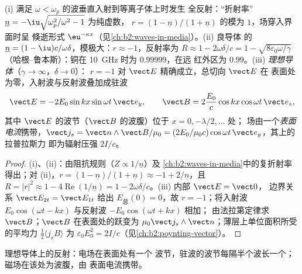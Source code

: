 \begin{proposition}[等离子体与金属上的反射]\label{prop:b2:wave-interfaces:conductors}
(i) 满足 $\omega < \omega_p$ 的波垂直入射到等离子体上时发生
全反射：“折射率”$\underline n = -\iu\sqrt{\omega_p^2/\omega^2 - 1}$ 为纯虚数，
$r = (1 - \underline n)/(1 + \underline n)$ 的模为 $1$，场穿入界面时呈
倏逝形式 $\eu^{-\kappa x}$（见\cref{ch:b2:waves-in-media}）。(ii) 良导体
的 $\underline n = (1 - \iu)c/\omega\delta$，模极大：$r \approx
-1$，反射率为 $R \approx 1 - 2\omega\delta/c = 1 - \sqrt{8\varepsilon_0\omega/\gamma}$
（哈根–鲁本斯）：铜在 \qty{10}{GHz} 时为 $0.99999$，在远
红外区为 $0.99$。(iii) \emph{理想导体}（$\gamma \to \infty$，$\delta \to 0$）：
$r = -1$ 对 $\vect E$ 精确成立，总切向 $\vect E$ 在
表面处为零，入射波与反射波叠加成驻波
\[
\vect E = -2E_0\sin kx\sin\omega t\,\vect e_y , \qquad
\vect B = 2\frac{E_0}c\cos kx\cos\omega t\,\vect e_z ,
\]
其中 $\vect E$ 的波节（$\vect B$ 的波腹）位于 $x = 0, -\lambda/2, \dots$ 处；
场由一个\emph{表面电流}携带，$\vect j_s = \vect n\wedge\vect B/
\mu_0 = (2E_0/\mu_0c)\cos\omega t\,\vect e_y$，其上的拉普拉斯力
即为辐射压强 $2I/c$。
\end{proposition}

\begin{proof}
(i)、(ii)：由阻抗规则（$Z \propto 1/\underline n$）及
\cref{ch:b2:waves-in-media}中的复折射率得出；对 (ii)，$r = (1 - \underline n)/(1 +
\underline n) \approx -1 + 2/\underline n$，且 $R = |r|^2 \approx 1 - 4\operatorname{Re}(1/
\underline n) = 1 - 2\omega\delta/c$。(iii) 内部 $\vect E = \vect 0$，
边界关系 $\vect E_{2t} = \vect E_{1t}$ 给出 $E_{\text{总}}(0) = 0$，故 $r =
-1$；将入射波 $E_0\cos(\omega t - kx)$ 与反射波 $-E_0\cos(\omega t + kx)$ 相加；
由法拉第定律求 $\vect B$；$\vect B$ 在表面处的跃变为 $\mu_0\vect j_s
\wedge\vect n$；薄层上单位面积所受的平均力 $\tfrac12\langle j_sB\rangle$ 为
$\varepsilon_0E_0^2 = 2I/c$（见\cref{ch:b2:poynting-vector}）。
\end{proof}

\begin{omfigure}

{\small 理想导体上的反射：电场在表面处有一个
波节，驻波的波节每隔半个波长一个；
磁场在该处为波腹，由
表面电流携带。}
\end{omfigure}

